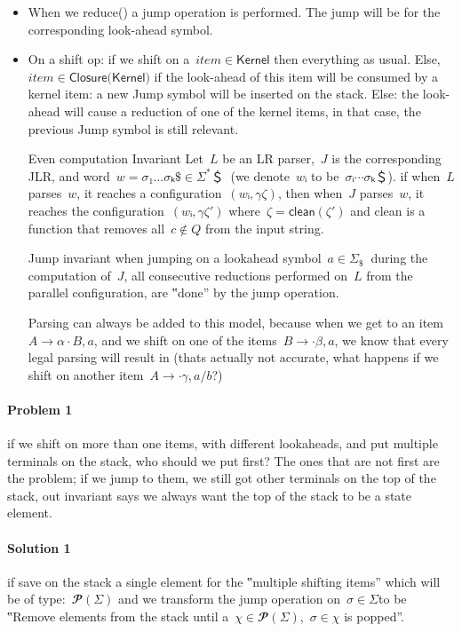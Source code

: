 \begin{itemize}
  \item When we \textsf{reduce()} a jump operation is performed.
    The jump will be for the corresponding look-ahead symbol.
  \item On a shift op:
  if we shift on a~$item∈\textsf{Kernel}$
    then everything as usual.
  Else,~$item∈\textsf{Closure(Kernel)}$
      if the look-ahead of this item will be consumed by a kernel item:
        a new Jump symbol will be inserted on the stack.
      Else:
        the look-ahead will cause a reduction of one of the kernel items,
        in that case, the previous Jump symbol is still relevant.
  \item[Even computation Invariant]
    Let~$L$ be an LR parser,~$J$ is the corresponding JLR, and word~$w =σ₁…σₖ \$∈Σ^*＄~$ (we denote~$wᵢ$ to be~$σᵢ⋯σₖ ＄$).
    if when~$L$ parses~$w$, it reaches a configuration~$(wᵢ,γζ)$,
    then when~$J$ parses~$w$, it reaches the configuration~$(wᵢ,γζ')$ where~$ζ= \textsf{clean}(ζ')$
    and \textsf{clean} is a function that removes all~$c∉Q$ from the input string.
  \item[Jump invariant]
    when jumping on a lookahead symbol~$a∈Σ_\$~$ during the computation of~$J$,
    all consecutive reductions performed on~$L$ from the parallel configuration, are ‟done” by the \textsf{jump} operation.
  \item[Parsing] can always be added to this model, because when we get to an item~$A→α·B,a$, and we shift on
    one of the items~$B→·β,a$, we know that every legal parsing will result in (thats actually not accurate, what happens
    if we shift on another item~$A→·γ,a/b$?)
\end{itemize}
\paragraph{Problem 1} if we shift on more than one items, with different lookaheads,
  and put multiple terminals on the stack, who should we put first? The ones that are
  not first are the problem; if we jump to them, we still got other terminals on the
  top of the stack, out invariant says we always want the top of the stack to be a
  state element.

\paragraph{Solution 1} if save on the stack a single element for the
  ‟multiple shifting items” which will be of type:~$𝓟(Σ)$
  and we transform the jump operation on~$σ∈Σ$to be ‟Remove elements
  from the stack until a~$χ∈𝓟(Σ)$,~$σ∈χ$ is popped”.


